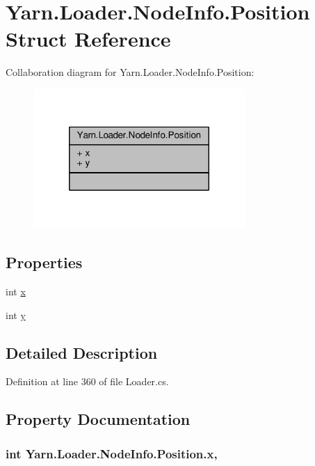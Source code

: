 \hypertarget{a00151}{\section{Yarn.\-Loader.\-Node\-Info.\-Position Struct Reference}
\label{a00151}
}


Collaboration diagram for Yarn.\-Loader.\-Node\-Info.\-Position\-:
\nopagebreak
\begin{figure}[H]
\begin{center}
\leavevmode
\includegraphics[width=228pt]{a00665}
\end{center}
\end{figure}
\subsection*{Properties}
\begin{DoxyCompactItemize}
\item 
int \hyperlink{a00151_a6b40110781090293fbcd2d6f7695ae4d}{x}
\item 
int \hyperlink{a00151_a390d560bd9faa3a32d8a0489c69be9e0}{y}
\end{DoxyCompactItemize}


\subsection{Detailed Description}


Definition at line 360 of file Loader.\-cs.



\subsection{Property Documentation}
\hypertarget{a00151_a6b40110781090293fbcd2d6f7695ae4d}{
\subsubsection[{x}]{\setlength{\rightskip}{0pt plus 5cm}int Yarn.\-Loader.\-Node\-Info.\-Position.\-x\hspace{0.3cm}{\ttfamily [get]}, {\ttfamily [set]}}}\label{a00151_a6b40110781090293fbcd2d6f7695ae4d}


